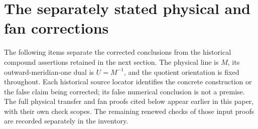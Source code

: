 \section{The separately stated physical and fan corrections}
The following items separate the corrected conclusions from the
historical compound assertions retained in the next section.  The
physical line is \(M\), its outward-meridian-one dual is
\(U=M^{-1}\), and the quotient orientation is fixed throughout.
Each historical source locator identifies the concrete construction
or the false claim being corrected; its false numerical conclusion
is not a premise.  The full physical transfer and fan proofs cited
below appear earlier in this paper, with their own check scopes.
The remaining renewed checks of those input proofs are recorded
separately in the inventory.



